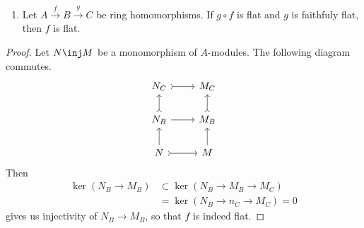 \documentclass[12pt]{amsart}
\begin{document}
\begin{enumerate}
  \item[17.] {
      Let $A\xrightarrow{f}B\xrightarrow{g}C$ be ring homomorphisms.
      If $g\circ f$ is flat and $g$ is faithfuly flat, then $f$ is flat.
    }
\end{enumerate}

\begin{proof}
  Let $N\inj M$ be a monomorphism of $A$-modules.
  The following diagram commutes.
  \[
    \begin{tikzcd}
      N_C\ar[r,tail]&M_C \\
      N_B\ar[u,tail]\ar[r]&M_B\ar[u,tail] \\
      N\ar[u]\ar[r,tail]&M\ar[u]
    \end{tikzcd}
  \] 
  Then
  \begin{align*}
    \ker(N_B\to M_B)&\subset \ker(N_B\to M_B\to M_C) \\
                    &=\ker(N_B\to n_C\to M_C) 
                    =0
  \end{align*}
  gives us injectivity of $N_B\to M_B$, so that $f$ is indeed flat.
\end{proof}
\end{document}
